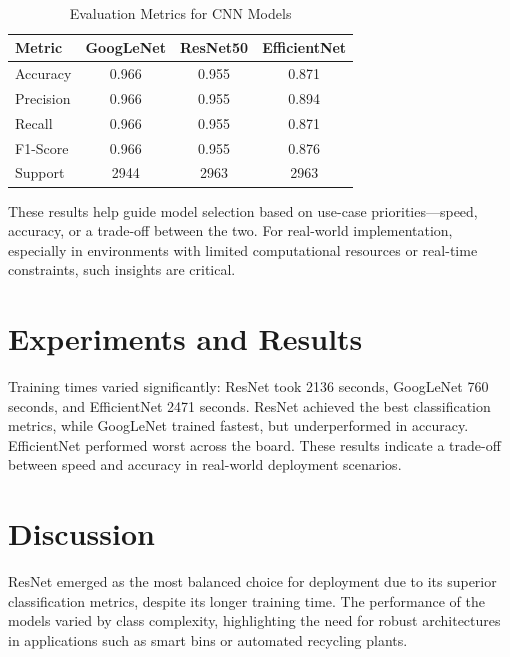 \documentclass[11pt,twocolumn]{article}
\begin{document}
\begin{table}[h]
\centering
\caption{Evaluation Metrics for CNN Models}
\
\renewcommand{\arraystretch}{1.2} %
\begin{tabular}{|l|c|c|c|}

\hline
\textbf{\scriptsize Metric} & \textbf{\scriptsize GoogLeNet} & \textbf{\scriptsize ResNet50} & \textbf{\scriptsize EfficientNet} \\
\hline
Accuracy        & 0.966 & 0.955 & 0.871 \\
Precision       & 0.966 & 0.955 & 0.894 \\
Recall          & 0.966 & 0.955 & 0.871 \\
F1-Score        & 0.966 & 0.955 & 0.876 \\
Support         & 2944  & 2963  & 2963 \\
\hline
\end{tabular}
\label{tab:evaluation-smallheader}
\end{table}



These results help guide model selection based on use-case priorities—speed, accuracy, or a trade-off between the two. For real-world implementation, especially in environments with limited computational resources or real-time constraints, such insights are critical.




\section{Experiments and Results}
\label{sec:experiments}
Training times varied significantly: ResNet took 2136 seconds, GoogLeNet 760 seconds, and EfficientNet 2471 seconds. ResNet achieved the best classification metrics, while GoogLeNet trained fastest, but underperformed in accuracy. EfficientNet performed worst across the board. These results indicate a trade-off between speed and accuracy in real-world deployment scenarios.

\section{Discussion}
\label{sec:discussion}
ResNet emerged as the most balanced choice for deployment due to its superior classification metrics, despite its longer training time. The performance of the models varied by class complexity, highlighting the need for robust architectures in applications such as smart bins or automated recycling plants. 
\end{document}
